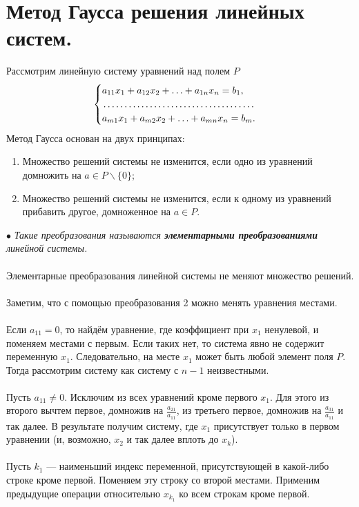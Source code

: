 \section{Метод Гаусса решения линейных систем.}
Рассмотрим линейную систему уравнений над полем $P$ $$\begin{cases}
	a_{11}x_1 + a_{12}x_2 + \ldots + a_{1n} x_n = b_1,\\
	\dotfill\\
	a_{m1}x_1 + a_{m2} x_2 + \ldots + a_{mn} x_n = b_m.
\end{cases}$$
Метод Гаусса основан на двух принципах:\begin{enumerate}
	\item  Множество решений системы не изменится, если одно из уравнений домножить на $a \in P\backslash\{0\}$;
	\item Множество решений системы не изменится, если к одному из уравнений прибавить другое,
	домноженное на $a\in P$.
\end{enumerate}
$\bullet$ \textit{Такие преобразования называются \textbf{элементарными преобразованиями} линейной системы.}\\\\
Элементарные преобразования линейной системы не меняют множество решений.\\\\
Заметим, что с помощью преобразования 2 можно менять уравнения местами.\\\\
Если $a_{11} = 0$, то найдём уравнение, где коэффициент при $x_1$ ненулевой, и поменяем местами с первым.
Если таких нет, то система явно не содержит переменную $x_1$. Следовательно, на месте $x_1$ может быть любой
элемент поля $P$. Тогда рассмотрим систему как систему с $n-1$ неизвестными.\\\\
Пусть $a_{11} \ne 0$. Исключим из всех уравнений кроме первого $x_1$. Для этого из второго вычтем первое, домножив на $\frac{a_{21}}{a_{11}}$, из третьего первое, домножив на $\frac{a_{31}}{a_{11}}$ и так далее. В результате получим систему, где $x_1$ присутствует только в первом уравнении (и, возможно, $x_2$ и так далее вплоть до $x_k$).\\\\
Пусть $k_1$ --- наименьший индекс переменной, присутствующей в какой-либо строке кроме первой.
Поменяем эту строку со второй местами. Применим предыдущие операции относительно $x_{k_1}$ ко всем
строкам кроме первой.\\\\
